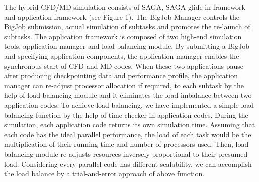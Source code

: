 \documentclass[a4paper]{article}
\begin{document}
The hybrid CFD/MD simulation consists of SAGA, SAGA glide-in framework and application framework (see Figure 1).  The BigJob Manager controls the BigJob submission, actual simulation of subtasks and promotes the re-launch of subtasks. The application framework is composed of two high-end simulation tools, application manager and load balancing module. By submitting a BigJob and specifying application components, the application manager enables the synchronous start of CFD and MD codes. When these two applications pause after producing checkpointing data and performance profile, the application manager can re-adjust processor allocation if required, to each subtask by the help of load balancing module and it eliminates the load imbalance between two application codes.  To achieve load balancing, we have implemented a simple load balancing function by the help of time checker in application codes. During the simulation, each application code returns its own simulation time. Assuming that each code has the ideal parallel performance, the load of each task would be the multiplication of their running time and number of processors used. Then, load balancing module re-adjusts resources inversely proportional to their presumed load. Considering every parallel code has different scalability, we can accomplish the load balance by a trial-and-error approach of above function.
\end{document}
